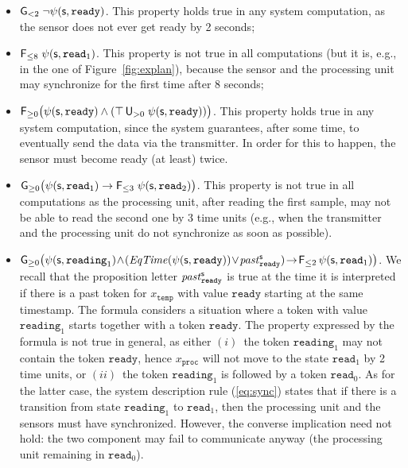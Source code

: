 \begin{example}
\begin{itemize}
    \item $\textsf{G}_{<2}\;\neg \psi(\mathsf{s},\mathtt{ready})$. This property holds true in any system computation, as the sensor does not ever get ready by 2 seconds;
    \item $\textsf{F}_{\leq 8}\; \psi(\mathsf{s},\mathtt{read}_1)$. This property is not true in all computations (but it is, e.g., in the one of Figure~\ref{fig:explan}), because the sensor and the processing unit may synchronize for the first time after 8 seconds;
    \item $\textsf{F}_{\geq 0}\big(\psi(\mathsf{s},\mathtt{ready}) \wedge (\operatorname{\top}\textsf{U}_{>0}\;\psi(\mathsf{s},\mathtt{ready}))\big)$. This property holds true in any system computation, since the system guarantees, after some time, to eventually send the data via the transmitter. In order for this to happen, the sensor must become ready (at least) twice.
    \item $\textsf{G}_{\geq 0} \big(\psi(\mathsf{s},\mathtt{read}_1) \to \textsf{F}_{\leq 3}\; \psi(\mathsf{s},\mathtt{read}_2)\big)$. %
    This property is not true in all computations as the processing unit, after reading the first sample, may not be able to read the second one by 3 time units (e.g., when the transmitter and the processing unit do not synchronize as soon as possible).
    \item {\small $\textsf{G}_{\geq 0} \big(\psi(\mathsf{s},\mathtt{reading}_1) \!\wedge\! ({\mathit{EqTime}}(\psi(\mathsf{s},\mathtt{ready}))\!\vee\! {\mathit{past}}_\mathtt{ready}^{\mathsf{s}}) \!\to\! \textsf{F}_{\leq 2}\, \psi(\mathsf{s},\mathtt{read}_1) \big)$}. 
    We recall that the proposition letter ${\mathit{past}}_\mathtt{ready}^{\mathsf{s}}$ is true at the time it is interpreted if there is a past token for $x_\mathtt{temp}$ with value $\mathtt{ready}$ starting at the same timestamp. 
%
    The formula considers a situation where a token with value $\mathtt{reading}_1$ starts together with a token $\mathtt{ready}$. %
    The property expressed by the formula is not true in general, as either 
    $(i)$~the token $\mathtt{reading}_1$ may not contain the token $\mathtt{ready}$, hence $x_\mathtt{proc}$ will not move to the state $\mathtt{read}_1$ by 2 time units, or
    $(ii)$~the token $\mathtt{reading}_1$ is followed by a token $\mathtt{read}_0$. As for the latter case,
    the system description rule (\ref{eq:sync}) states that if there is a transition from state $\mathtt{reading}_1$ to $\mathtt{read}_1$, then the processing unit and the sensors must have synchronized. However, the converse implication need not hold: the two component may fail to communicate anyway (the processing unit remaining in $\mathtt{read}_0$).
\end{itemize}
\end{example}

